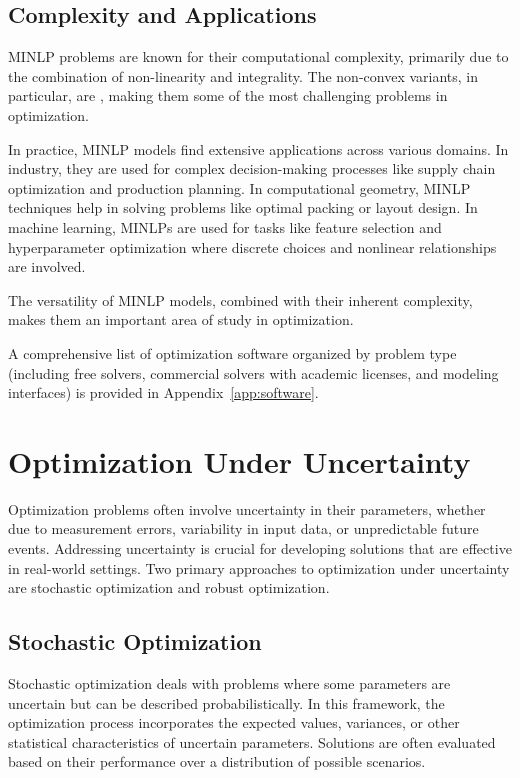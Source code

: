 \subsection*{Complexity and Applications}
MINLP problems are known for their computational complexity, primarily due to the combination of non-linearity and integrality. The non-convex variants, in particular, are \nphard, making them some of the most challenging problems in optimization.

In practice, MINLP models find extensive applications across various domains. In industry, they are used for complex decision-making processes like supply chain optimization and production planning. In computational geometry, MINLP techniques help in solving problems like optimal packing or layout design. In machine learning, MINLPs are used for tasks like feature selection and hyperparameter optimization where discrete choices and nonlinear relationships are involved.

The versatility of MINLP models, combined with their inherent complexity, makes them an important area of study in optimization.

A comprehensive list of optimization software organized by problem type (including free solvers, commercial solvers with academic licenses, and modeling interfaces) is provided in Appendix~\ref{app:software}.

\section{Optimization Under Uncertainty}

Optimization problems often involve uncertainty in their parameters, whether due to measurement errors, variability in input data, or unpredictable future events. Addressing uncertainty is crucial for developing solutions that are effective in real-world settings. Two primary approaches to optimization under uncertainty are stochastic optimization and robust optimization.

\subsection{Stochastic Optimization}

Stochastic optimization deals with problems where some parameters are uncertain but can be described probabilistically. In this framework, the optimization process incorporates the expected values, variances, or other statistical characteristics of uncertain parameters. Solutions are often evaluated based on their performance over a distribution of possible scenarios. 

